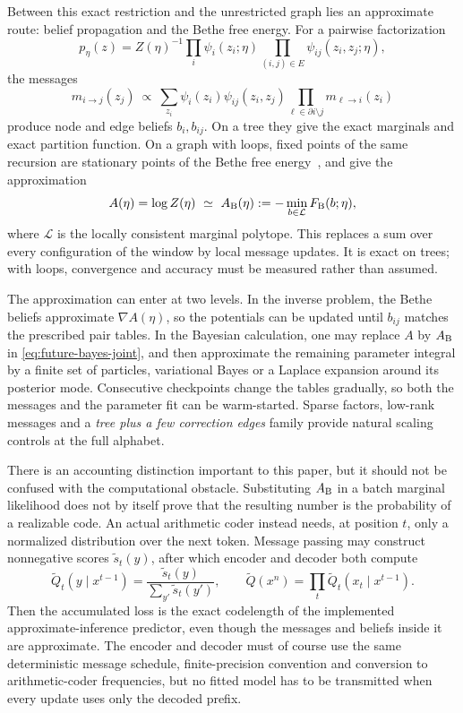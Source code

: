 \documentclass[11pt]{article}
\begin{document}
Between this exact restriction and the unrestricted graph lies an
approximate route: belief propagation and the Bethe free energy.  For
a pairwise factorization
\[
  p_\eta(z)=Z(\eta)^{-1}
    \prod_i\psi_i(z_i;\eta)
    \prod_{(i,j)\in E}\psi_{ij}(z_i,z_j;\eta),
\]
the messages
\begin{equation}
\label{eq:future-bp-message}
  m_{i\to j}(z_j)
  \ \propto\
  \sum_{z_i}\psi_i(z_i)\psi_{ij}(z_i,z_j)
  \prod_{\ell\in\partial i\setminus j}m_{\ell\to i}(z_i)
\end{equation}
produce node and edge beliefs $b_i,b_{ij}$.  On a tree they give the
exact marginals and exact partition function.  On a graph with loops,
fixed points of the same recursion are stationary points of the Bethe
free energy~\cite{yedidia}, and give the approximation
\begin{equation}
\label{eq:future-bethe}
  A(\eta)=\log Z(\eta)
  \ \simeq\
  A_{\rm B}(\eta):=-\min_{b\in\mathcal L}F_{\rm B}(b;\eta),
\end{equation}
where $\mathcal L$ is the locally consistent marginal polytope.  This
replaces a sum over every configuration of the window by local message
updates.  It is exact on trees; with loops, convergence and accuracy
must be measured rather than assumed.

The approximation can enter at two levels.  In the inverse problem,
the Bethe beliefs approximate $\nabla A(\eta)$, so the potentials can
be updated until $b_{ij}$ matches the prescribed pair tables.  In the
Bayesian calculation, one may replace $A$ by $A_{\rm B}$ in
\eqref{eq:future-bayes-joint}, and then approximate the remaining
parameter integral by a finite set of particles, variational Bayes or
a Laplace expansion around its posterior mode.  Consecutive
checkpoints change the tables gradually, so both the messages and the
parameter fit can be warm-started.  Sparse factors, low-rank messages
and a \emph{tree plus a few correction edges} family provide natural
scaling controls at the full alphabet.

There is an accounting distinction important to this paper, but it
should not be confused with the computational obstacle.  Substituting
$A_{\rm B}$ in a batch marginal likelihood does not by itself prove
that the resulting number is the probability of a realizable code.
An actual arithmetic coder instead needs, at position $t$, only a
normalized distribution over the next token.  Message passing may
construct nonnegative scores $\widetilde s_t(y)$, after which encoder
and decoder both compute
\begin{equation}
\label{eq:future-bp-code}
  \widetilde Q_t(y\mid x^{t-1})
  =
  \frac{\widetilde s_t(y)}
       {\sum_{y'}\widetilde s_t(y')},
  \qquad
  \widetilde Q(x^n)=\prod_t
       \widetilde Q_t(x_t\mid x^{t-1}).
\end{equation}
Then the accumulated loss is the exact codelength of the implemented
approximate-inference predictor, even though the messages and beliefs
inside it are approximate.  The encoder and decoder must of course use
the same deterministic message schedule, finite-precision convention
and conversion to arithmetic-coder frequencies, but no fitted model
has to be transmitted when every update uses only the decoded prefix.
\end{document}
